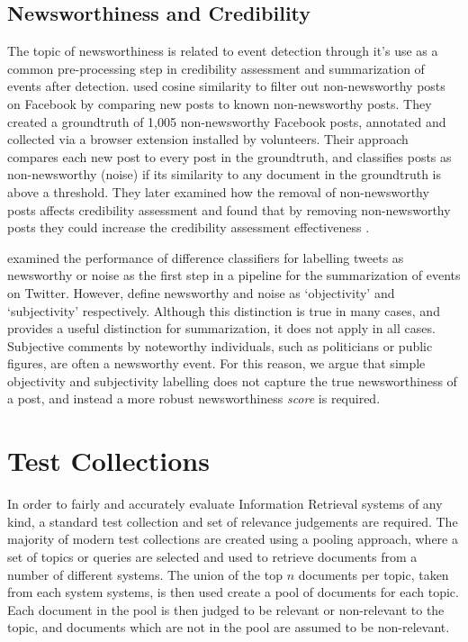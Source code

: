 
\subsection{Newsworthiness and Credibility}
The topic of newsworthiness is related to event detection through it's use as a common pre-processing step in credibility assessment and summarization of events after detection.
\cite{Noyunsan16} used cosine similarity to filter out non-newsworthy posts on Facebook by comparing new posts to known non-newsworthy posts.
They created a groundtruth of 1,005 non-newsworthy Facebook posts, annotated and collected via a browser extension installed by volunteers.
Their approach compares each new post to every post in the groundtruth, and classifies posts as non-newsworthy (noise) if its similarity to any document in the groundtruth is above a threshold.
They later examined how the removal of non-newsworthy posts affects credibility assessment and found that by removing non-newsworthy posts they could increase the credibility assessment effectiveness \citep{Noyunsan17}.

\cite{Madhawa15} examined the performance of difference classifiers for labelling tweets as newsworthy or noise as the first step in a pipeline for the summarization of events on Twitter.
However, \cite{Madhawa15} define newsworthy and noise as `objectivity' and `subjectivity' respectively.
Although this distinction is true in many cases, and provides a useful distinction for summarization, it does not apply in all cases.
Subjective comments by noteworthy individuals, such as politicians or public figures, are often a newsworthy event.
For this reason, we argue that simple objectivity and subjectivity labelling does not capture the true newsworthiness of a post, and instead a more robust newsworthiness \emph{score} is required.

\section{Test Collections}
\label{background:sec:collections}
In order to fairly and accurately evaluate Information Retrieval systems of any kind, a standard test collection and set of relevance judgements are required.
The majority of modern test collections are created using a pooling approach, where a set of topics or queries are selected and used to retrieve documents from a number of different systems.
The union of the top \(n\) documents per topic, taken from each system systems, is then used create a pool of documents for each topic.
Each document in the pool is then judged to be relevant or non-relevant to the topic, and documents which are not in the pool are assumed to be non-relevant.

